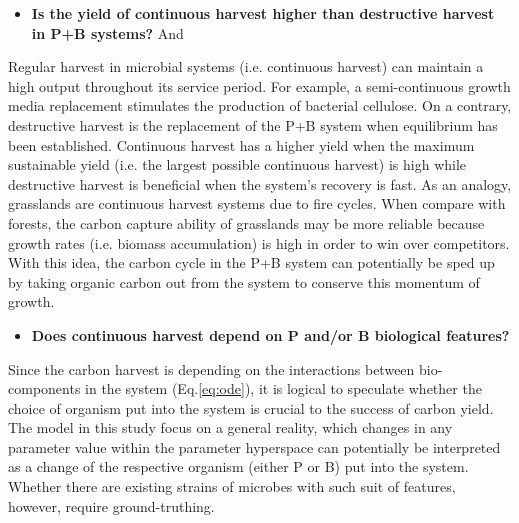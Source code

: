 \documentclass[../thesis.tex]{subfiles} %
\begin{document}
\begin{itemize}
    \item \textbf{
    Is the yield of continuous harvest higher than destructive harvest in P+B systems?
    } And
\end{itemize}

Regular harvest in microbial systems (i.e. continuous harvest) can maintain a high output throughout its service period.  For example, a semi-continuous growth media replacement stimulates the production of bacterial cellulose.\autocite{aytekin2016statistical}  On a contrary, destructive harvest is the replacement of the P+B system when equilibrium has been established.  Continuous harvest has a higher yield when the maximum sustainable yield (i.e. the largest possible continuous harvest) is high while destructive harvest is beneficial when the system's recovery is fast.  As an analogy, grasslands are continuous harvest systems due to fire cycles.  When compare with forests, the carbon capture ability of grasslands may be more reliable\autocite{dass2018grasslands} because growth rates (i.e. biomass accumulation) is high in order to win over competitors.  With this idea, the carbon cycle in the P+B system can potentially be sped up by taking organic carbon out from the system to conserve this momentum of growth.

\begin{itemize}
    \item \textbf{
    Does continuous harvest depend on P and/or B biological features?
    }
\end{itemize}


Since the carbon harvest is depending on the interactions between bio-components in the system (Eq.\ref{eq:ode}), it is logical to speculate whether the choice of organism put into the system is crucial to the success of carbon yield.  The model in this study focus on a general reality, which changes in any parameter value within the parameter hyperspace can potentially be interpreted as a change of the respective organism (either P or B) put into the system.  Whether there are existing strains of microbes with such suit of features, however, require ground-truthing.
\end{document}
